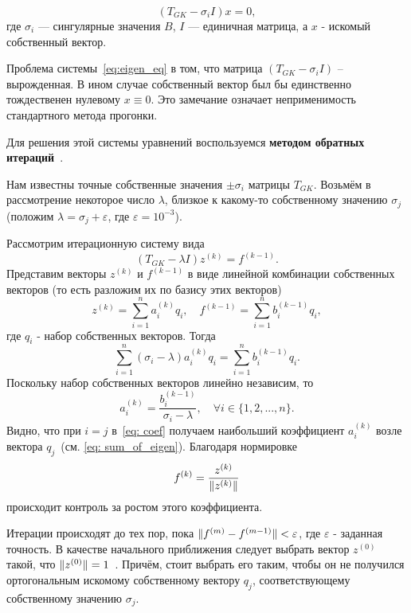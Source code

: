 \begin{equation}
\label{eq:eigen_eq}
( T_{GK} - \sigma_i I )x = 0,
\end{equation}
где \( \sigma_i \) — сингулярные значения \( B \), \( I \) — единичная матрица, а \(x\) - искомый собственный вектор.

Проблема системы~\eqref{eq:eigen_eq} в том, что матрица \((T_{GK}-\sigma_iI)\) -- вырожденная. В ином случае собственный вектор был бы единственно тождественен нулевому \(x\equiv 0\). Это замечание означает неприменимость стандартного метода прогонки.

Для решения этой системы уравнений воспользуемся \textbf{методом обратных итераций}~\cite[стр. 111]{verzhbitsky2021}. 

Нам известны точные собственные значения \(\pm\sigma_i\) матрицы \(T_{GK}\). Возьмём в рассмотрение некоторое число \(\lambda\), близкое к какому-то собственному значению \(\sigma_j\) (положим \(\lambda=\sigma_j+\varepsilon\), где \(\varepsilon=10^{-3}\)). 

Рассмотрим итерационную систему вида
\begin{equation}
    \label{eq:eigen_it_eq}
    (T_{GK}-\lambda I)z^{(k)}=f^{(k-1)}.  
\end{equation}
Представим векторы \(z^{(k)}\) и \(f^{(k-1)}\) в виде линейной комбинации собственных векторов (то есть разложим их по базису этих векторов)
\begin{equation}
\label{eq: sum_of_eigen}
z^{(k)}=\sum_{i=1}^na^{(k)}_{i}q_{i}, \quad f^{(k-1)}=\sum_{i=1}^nb^{(k-1)}_{i}q_{i},
\end{equation}
где \(q_i\) - набор собственных векторов. Тогда
\[
    \sum_{i=1}^n(\sigma_{i}-\lambda)a^{(k)}_{i}q_{i}=\sum_{i=1}^{n}b^{(k-1)}_iq_i.
\]
Поскольку набор собственных векторов линейно независим, то
\begin{equation}
\label{eq: coef}
    a_i^{(k)}=\frac{b^{(k-1)}_i}{\sigma_i-\lambda}, \quad \forall i \in \{1,2,...,n\}.
\end{equation}
Видно, что при \(i=j\) в~\eqref{eq: coef} получаем наибольший коэффициент \(a_i^{(k)}\) возле вектора \(q_j\)~(см. \eqref{eq: sum_of_eigen}). Благодаря нормировке
\[
    f^{(k)}=\frac{z^{(k)}}{\Arrowvert z^{(k)}\Arrowvert}
\]
происходит контроль за ростом этого коэффициента.

Итерации происходят до тех пор, пока \(\Arrowvert f^{(m)}-f^{(m-1)}\Arrowvert < \varepsilon\), где \(\varepsilon\) - заданная точность. В качестве начального приближения следует выбрать вектор \(z^{(0)}\) такой, что \(\Arrowvert z^{(0)} \Arrowvert=1\)~\cite[стр. 113]{verzhbitsky2021}. Причём, стоит выбрать его таким, чтобы он не получился ортогональным искомому собственному вектору \(q_j\), соответствующему собственному значению \(\sigma_j\).

